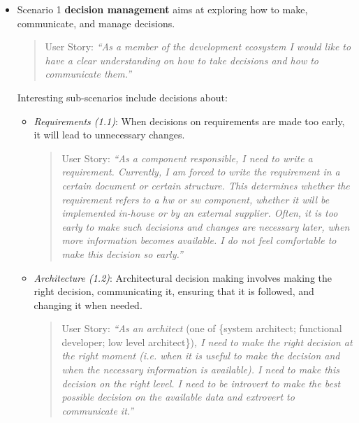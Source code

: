 \begin{itemize}
\item Scenario 1 {\bf decision management } aims at exploring how to make, communicate, and manage decisions. 

\begin{quote}
{User Story:} \emph{``As a member of the development ecosystem I would like to have a clear understanding on how to take decisions and how to communicate them.''}
\end{quote}


Interesting sub-scenarios include decisions about:

\begin{itemize}
\item  {\em Requirements (1.1)}: When decisions on requirements are made too early, it will lead to unnecessary changes.


\begin{quote}
{User Story:} 
\emph{``As a component responsible, I need to write a requirement. 
Currently, I am forced to write the requirement in a certain document or certain structure. 
This determines whether the requirement refers to a hw or sw component, whether it will be implemented in-house or by an external supplier. 
Often, it is too early to make such decisions and changes are necessary later, when more information becomes available. 
I do not feel comfortable to make this decision so early.''}
\end{quote}

\item {\em Architecture (1.2)}: Architectural decision making involves making the right decision, communicating it, ensuring that it is followed, and changing it when needed. 


\begin{quote}
{User Story:} 
\emph{``As an architect} (one of \{system architect; functional developer; low level architect\})\emph{, I need to make the right decision at the right moment (i.e. when it is useful to make the decision and when the necessary information is available).  
I need to make this decision on the right level. 
I need to be introvert to make the best possible decision on the available data and extrovert to communicate it.''}
\end{quote}


\end{itemize}
\end{itemize}

